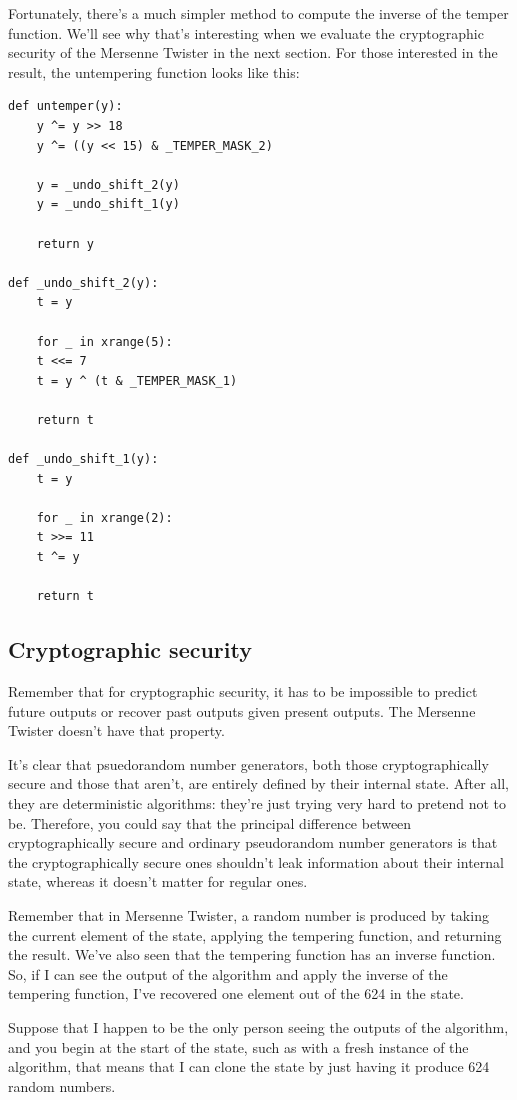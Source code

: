 \documentclass[11pt,ebook,table,dvipsnames]{memoir}
\begin{document}
Fortunately, there's a much simpler method to compute the inverse of
the temper function. We'll see why that's interesting when we evaluate
the cryptographic security of the Mersenne Twister in the next
section. For those interested in the result, the untempering function
looks like this:

\begin{verbatim}
def untemper(y):
    y ^= y >> 18
    y ^= ((y << 15) & _TEMPER_MASK_2)

    y = _undo_shift_2(y)
    y = _undo_shift_1(y)

    return y

def _undo_shift_2(y):
    t = y

    for _ in xrange(5):
	t <<= 7
	t = y ^ (t & _TEMPER_MASK_1)

    return t

def _undo_shift_1(y):
    t = y

    for _ in xrange(2):
	t >>= 11
	t ^= y

    return t
\end{verbatim}
\subsection{Cryptographic security}
\label{sec-2-10-6-5}

Remember that for cryptographic security, it has to be impossible to
predict future outputs or recover past outputs given present outputs.
The Mersenne Twister doesn't have that property.

It's clear that psuedorandom number generators, both those
cryptographically secure and those that aren't, are entirely defined
by their internal state. After all, they are deterministic algorithms:
they're just trying very hard to pretend not to be. Therefore, you
could say that the principal difference between cryptographically
secure and ordinary pseudorandom number generators is that the
cryptographically secure ones shouldn't leak information about their
internal state, whereas it doesn't matter for regular ones.

Remember that in Mersenne Twister, a random number is produced by
taking the current element of the state, applying the tempering
function, and returning the result. We've also seen that the tempering
function has an inverse function. So, if I can see the output of the
algorithm and apply the inverse of the tempering function, I've
recovered one element out of the 624 in the state.

Suppose that I happen to be the only person seeing the outputs of the
algorithm, and you begin at the start of the state, such as with a
fresh instance of the algorithm, that means that I can clone the state
by just having it produce 624 random numbers.
\end{document}
